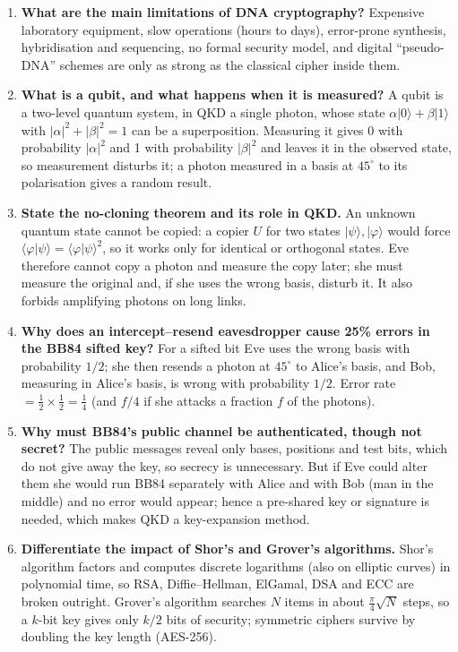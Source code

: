 \begin{enumerate}[leftmargin=1.6em,itemsep=3pt]
  \item \textbf{What are the main limitations of DNA cryptography?} Expensive laboratory equipment, slow operations (hours to days), error-prone synthesis, hybridisation and sequencing, no formal security model, and digital ``pseudo-DNA'' schemes are only as strong as the classical cipher inside them.
  \item \textbf{What is a qubit, and what happens when it is measured?} A qubit is a two-level quantum system, in QKD a single photon, whose state $\alpha\lvert 0\rangle + \beta\lvert 1\rangle$ with $|\alpha|^2 + |\beta|^2 = 1$ can be a superposition. Measuring it gives 0 with probability $|\alpha|^2$ and 1 with probability $|\beta|^2$ and leaves it in the observed state, so measurement disturbs it; a photon measured in a basis at $45^\circ$ to its polarisation gives a random result.
  \item \textbf{State the no-cloning theorem and its role in QKD.} An unknown quantum state cannot be copied: a copier $U$ for two states $\lvert\psi\rangle, \lvert\varphi\rangle$ would force $\langle\varphi|\psi\rangle = \langle\varphi|\psi\rangle^2$, so it works only for identical or orthogonal states. Eve therefore cannot copy a photon and measure the copy later; she must measure the original and, if she uses the wrong basis, disturb it. It also forbids amplifying photons on long links.
  \item \textbf{Why does an intercept--resend eavesdropper cause 25\% errors in the BB84 sifted key?} For a sifted bit Eve uses the wrong basis with probability $1/2$; she then resends a photon at $45^\circ$ to Alice's basis, and Bob, measuring in Alice's basis, is wrong with probability $1/2$. Error rate $= \frac12 \times \frac12 = \frac14$ (and $f/4$ if she attacks a fraction $f$ of the photons).
  \item \textbf{Why must BB84's public channel be authenticated, though not secret?} The public messages reveal only bases, positions and test bits, which do not give away the key, so secrecy is unnecessary. But if Eve could alter them she would run BB84 separately with Alice and with Bob (man in the middle) and no error would appear; hence a pre-shared key or signature is needed, which makes QKD a key-expansion method.
  \item \textbf{Differentiate the impact of Shor's and Grover's algorithms.} Shor's algorithm factors and computes discrete logarithms (also on elliptic curves) in polynomial time, so RSA, Diffie--Hellman, ElGamal, DSA and ECC are broken outright. Grover's algorithm searches $N$ items in about $\frac{\pi}{4}\sqrt N$ steps, so a $k$-bit key gives only $k/2$ bits of security; symmetric ciphers survive by doubling the key length (AES-256).

\end{enumerate}
